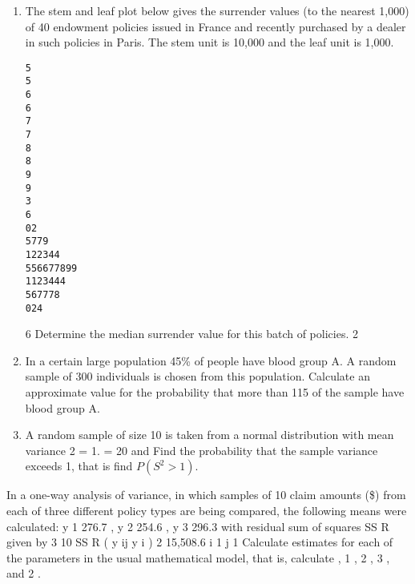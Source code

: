 \documentclass[a4paper,12pt]{article}
\begin{document}
\begin{enumerate}

\item %
The stem and leaf plot below gives the surrender values (to the nearest 1,000) of 40
endowment policies issued in France and recently purchased by a dealer in such
policies in Paris. The stem unit is 10,000 and the leaf unit is 1,000.
\begin{verbatim}
5
5
6
6
7
7
8
8
9
9
3
6
02
5779
122344
556677899
1123444
567778
024
\end{verbatim}

6
Determine the median surrender value for this batch of policies.
2
\item In a certain large population 45\% of people have blood group A. A random sample of 300 individuals is chosen from this population.
Calculate an approximate value for the probability that more than 115 of the sample have blood group A.


\item
A random sample of size 10 is taken from a normal distribution with mean variance 2 = 1.
= 20 and
Find the probability that the sample variance exceeds 1, that is find $P(S^2 > 1)$.

\end{enumerate}

In a one-way analysis of variance, in which samples of 10 claim amounts (\$) from each of three different policy types are being compared, the following means were
calculated:
y 1
276.7 ,
y 2
254.6 ,
y 3
296.3
with residual sum of squares SS R given by
3 10
SS R
( y ij
y i ) 2 15,508.6
i 1 j 1
Calculate estimates for each of the parameters in the usual mathematical model, that
is, calculate , 1 , 2 , 3 , and 2 .
\end{document}

